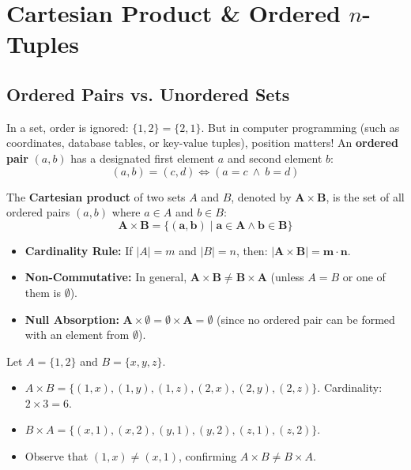 \documentclass[11pt,a4paper]{article}
\begin{document}
\section{Cartesian Product \& Ordered \texorpdfstring{$n$-Tuples}{n-Tuples}}

\subsection{Ordered Pairs vs. Unordered Sets}
In a set, order is ignored: $\{1, 2\} = \{2, 1\}$. But in computer programming (such as coordinates, database tables, or key-value tuples), position matters! 
An \textbf{ordered pair} $(a, b)$ has a designated first element $a$ and second element $b$:
\[
(a, b) = (c, d) \iff (a = c \ \land \ b = d)
\]

\begin{defbox}
The \textbf{Cartesian product} of two sets $A$ and $B$, denoted by $\mathbf{A \times B}$, is the set of all ordered pairs $(a, b)$ where $a \in A$ and $b \in B$:
\[
\mathbf{A \times B = \{ (a, b) \mid a \in A \land b \in B \}}
\]
\end{defbox}

\begin{notebox}
\begin{itemize}
    \item \textbf{Cardinality Rule:} If $|A| = m$ and $|B| = n$, then: $\mathbf{|A \times B| = m \cdot n}$.
    \item \textbf{Non-Commutative:} In general, $\mathbf{A \times B \neq B \times A}$ (unless $A = B$ or one of them is $\emptyset$).
    \item \textbf{Null Absorption:} $\mathbf{A \times \emptyset = \emptyset \times A = \emptyset}$ (since no ordered pair can be formed with an element from $\emptyset$).
\end{itemize}
\end{notebox}

\begin{examplebox}
Let $A = \{1, 2\}$ and $B = \{x, y, z\}$.
\begin{itemize}
    \item $A \times B = \big\{ (1, x), (1, y), (1, z), (2, x), (2, y), (2, z) \big\}$. Cardinality: $2 \times 3 = 6$.
    \item $B \times A = \big\{ (x, 1), (x, 2), (y, 1), (y, 2), (z, 1), (z, 2) \big\}$.
    \item Observe that $(1, x) \neq (x, 1)$, confirming $A \times B \neq B \times A$.
\end{itemize}
\end{examplebox}
\end{document}
